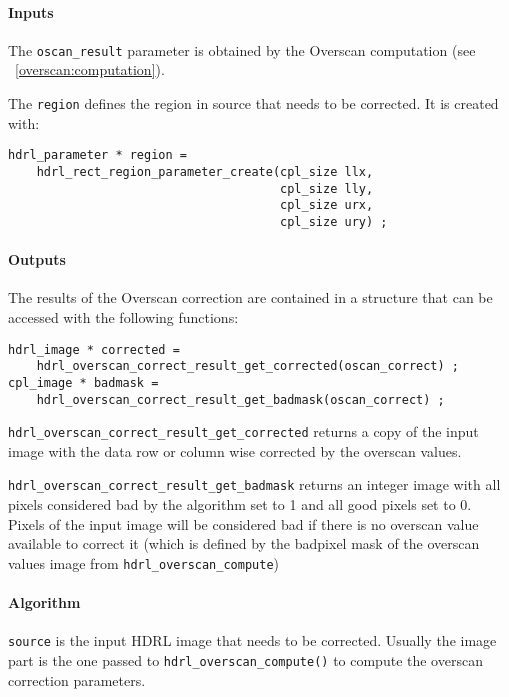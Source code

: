 \paragraph{Inputs}

The \verb+oscan_result+ parameter is obtained by the Overscan computation 
(see ~\ref{overscan:computation}).

The \verb+region+ defines the region in source that needs to be corrected. 
It is created with:
\begin{lstlisting}
hdrl_parameter * region =
    hdrl_rect_region_parameter_create(cpl_size llx, 
                                      cpl_size lly,
                                      cpl_size urx, 
                                      cpl_size ury) ;
\end{lstlisting}

\paragraph{Outputs}

The results of the Overscan correction are contained in a structure that 
can be accessed with the following functions:

\begin{lstlisting}
hdrl_image * corrected =
    hdrl_overscan_correct_result_get_corrected(oscan_correct) ;
cpl_image * badmask =
    hdrl_overscan_correct_result_get_badmask(oscan_correct) ;
\end{lstlisting}

\verb+hdrl_overscan_correct_result_get_corrected+ returns a copy of the input
image with the data row or column wise corrected by the overscan values.

\verb+hdrl_overscan_correct_result_get_badmask+ returns an integer image with
all pixels considered bad by the algorithm set to 1 and all
good pixels set to 0.
Pixels of the input image will be considered bad if there is no overscan value
available to correct it (which is defined by the badpixel mask of the overscan
values image from \verb+hdrl_overscan_compute+)

\paragraph{Algorithm}

\verb+source+ is the input HDRL image that needs to be corrected. Usually the 
image part is the one passed to \verb+hdrl_overscan_compute()+ to compute the 
overscan correction parameters.

